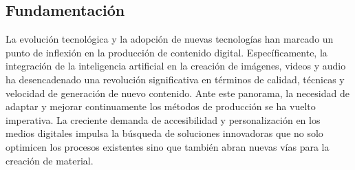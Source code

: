 \subsection{Fundamentación}

La evolución tecnológica y la adopción de nuevas tecnologías han marcado un punto de inflexión en la producción de contenido digital. Específicamente, la integración de la inteligencia artificial en la creación de imágenes, videos y audio ha desencadenado una revolución significativa en términos de calidad, técnicas y velocidad de generación de nuevo contenido. Ante este panorama, la necesidad de adaptar y mejorar continuamente los métodos de producción se ha vuelto imperativa. La creciente demanda de accesibilidad y personalización en los medios digitales impulsa la búsqueda de soluciones innovadoras que no solo optimicen los procesos existentes sino que también abran nuevas vías para la creación de material. 
